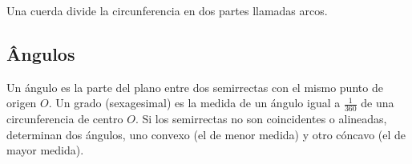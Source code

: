 Una cuerda divide la circunferencia en dos partes llamadas arcos.

\begin{center}
\end{center}

\subsection*{Ângulos}

Un ángulo es la parte del plano entre dos semirrectas con el mismo punto de
origen $O$. Un grado (sexagesimal)
es la medida de un ángulo igual a $\frac{1}{360}$ de una circunferencia
de centro $O$.
Si los semirrectas no son coincidentes o alineadas, determinan dos ángulos, uno
convexo (el de menor medida) y otro cóncavo (el de mayor medida).

